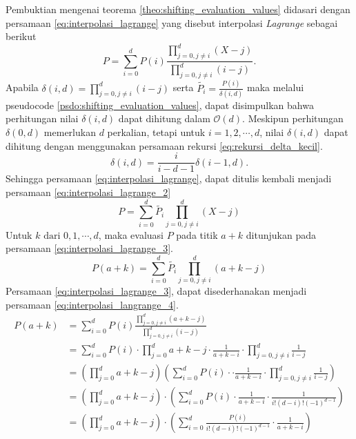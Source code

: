 Pembuktian mengenai teorema \ref{theo:shifting_evaluation_values} didasari dengan persamaan \eqref{eq:interpolasi_lagrange} yang disebut interpolasi \textit{Lagrange} sebagai berikut
\begin{equation}
	\label{eq:interpolasi_lagrange}
	P = \sum_{i=0}^d P(i) \frac{\prod_{j=0, j \neq i}^d (X-j)}{\prod_{j=0, j \neq i}^d (i-j)}.
\end{equation}
Apabila $ \delta(i,d) = \prod_{j=0, j \neq i}^d (i-j) $ serta $  \tilde{P_i} = \frac{P(i)}{\delta(i,d)} $ maka melalui pseudocode \ref{psdo:shifting_evaluation_values}, dapat disimpulkan bahwa perhitungan nilai $ \delta(i,d) $ dapat dihitung dalam $ \mathcal{O}{(d)} $. Meskipun perhitungan $ \delta(0,d) $ memerlukan $ d $ perkalian, tetapi untuk $ i = 1, 2, \cdots, d $, nilai $\delta(i,d) $ dapat dihitung dengan menggunakan persamaan rekursi \eqref{eq:rekursi_delta_kecil}.
\begin{equation}
	\delta(i,d) = \frac{i}{i - d - 1} \delta(i-1,d).
	\label{eq:rekursi_delta_kecil}
\end{equation}
Sehingga persamaan \eqref{eq:interpolasi_lagrange}, dapat ditulis kembali menjadi persamaan \eqref{eq:interpolasi_lagrange_2}
\begin{equation}
	P = \sum_{i=0}^d \tilde{P_i} \prod_{j=0, j \neq i}^d (X-j)
	\label{eq:interpolasi_lagrange_2}
\end{equation}
Untuk $ k \text{ dari } 0, 1, \cdots, d $, maka evaluasi $ P $ pada titik $ a + k $ ditunjukan pada persamaan \eqref{eq:interpolasi_lagrange_3}.
\begin{equation}
	P(a+k) = \sum_{i=0}^d \tilde{P_i} \prod_{j=0, j \neq i}^d (a+k-j)
	\label{eq:interpolasi_lagrange_3}
\end{equation}
Persamaan \eqref{eq:interpolasi_lagrange_3}, dapat disederhanakan menjadi persamaan \eqref{eq:interpolasi_langrange_4}.
\begin{equation}
	\begin{aligned}
	P(a+k)  &= \sum_{i=0}^d P(i) \frac{\prod_{j=0, j \neq i}^d (a+k-j)}{\prod_{j=0, j \neq i}^d (i-j)} \\
			&= \sum_{i=0}^d P(i) \cdot \prod_{j=0}^{d} a+k-j \cdot \frac{1}{a + k - i} \cdot \prod_{j=0, j\neq i}^d \frac{1}{i-j} \\
			&= \left( \prod_{j=0}^d a+k-j \right) \left( \sum_{i=0}^d P(i) \cdot  \cdot \frac{1}{a + k - i} \cdot \prod_{j=0, j\neq i}^d \frac{1}{i-j} \right) \\
			&= \left( \prod_{j=0}^d a+k-j \right) \cdot \left( \sum_{i=0}^d P(i) \cdot \frac{1}{a + k - i} \cdot \frac{1}{i! (d-i)! (-1)^{d-1}} \right) \\
			&= \left( \prod_{j=0}^d a+k-j \right) \cdot \left( \sum_{i=0}^d \frac{P(i)}{i! (d-i)! (-1)^{d-1}} \cdot \frac{1}{a + k - i} \right) \\
	\end{aligned}
	\label{eq:interpolasi_langrange_4}
\end{equation}
